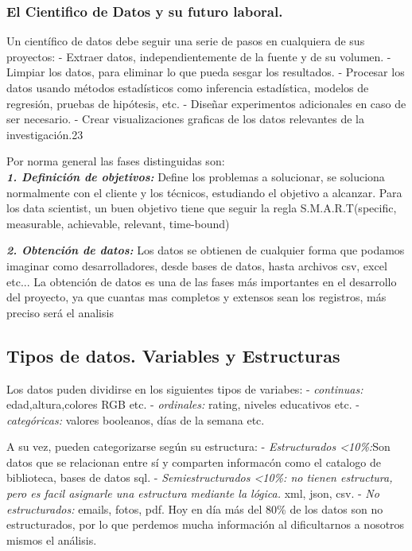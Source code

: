 \documentclass[11pt]{article}
\begin{document}
\subsubsection{El Cientifico de Datos y su futuro
laboral.}\label{el-cientifico-de-datos-y-su-futuro-laboral.}

Un científico de datos debe seguir una serie de pasos en cualquiera de
sus proyectos: - Extraer datos, independientemente de la fuente y de su
volumen. - Limpiar los datos, para eliminar lo que pueda sesgar los
resultados. - Procesar los datos usando métodos estadísticos como
inferencia estadística, modelos de regresión, pruebas de hipótesis, etc.
- Diseñar experimentos adicionales en caso de ser necesario. - Crear
visualizaciones graficas de los datos relevantes de la investigación.23

Por norma general las fases distinguidas son:\\
\textbf{\emph{1. Definición de objetivos:}} Define los problemas a
solucionar, se soluciona normalmente con el cliente y los técnicos,
estudiando el objetivo a alcanzar. Para los data scientist, un buen
objetivo tiene que seguir la regla S.M.A.R.T(specific, measurable,
achievable, relevant, time-bound)

\textbf{\emph{2. Obtención de datos:}} Los datos se obtienen de
cualquier forma que podamos imaginar como desarrolladores, desde bases
de datos, hasta archivos csv, excel etc... La obtención de datos es una
de las fases más importantes en el desarrollo del proyecto, ya que
cuantas mas completos y extensos sean los registros, más preciso será el
analisis

    \subsection{Tipos de datos. Variables y
Estructuras}\label{tipos-de-datos.-variables-y-estructuras}

Los datos puden dividirse en los siguientes tipos de variabes: -
\emph{continuas:} edad,altura,colores RGB etc. - \emph{ordinales:}
rating, niveles educativos etc. - \emph{categóricas:} valores booleanos,
días de la semana etc.

A su vez, pueden categorizarse según su estructura: -
\emph{Estructurados \textless{}10\%:}Son datos que se relacionan entre
sí y comparten informacón como el catalogo de biblioteca, bases de datos
sql. - \emph{Semiestructurados \textless{}10\%: no tienen estructura,
pero es facil asignarle una estructura mediante la lógica.} xml, json,
csv. - \emph{No estructurados:} emails, fotos, pdf. Hoy en día más del
80\% de los datos son no estructurados, por lo que perdemos mucha
información al dificultarnos a nosotros mismos el análisis.
\end{document}
